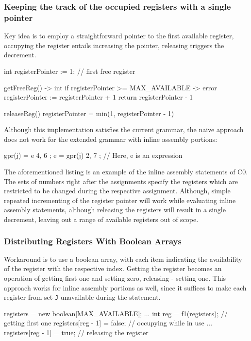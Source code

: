 \subsubsection{Keeping the track of the occupied registers with a single pointer}
Key idea is to employ a straightforward pointer to the first available register, occupying the register entails increasing the pointer,
releasing triggers the decrement.
\begin{codeblock}
int registerPointer := 1; // first free register

getFreeReg() -> int {
    if registerPointer >= MAX_AVAILABLE -> { error }
    registerPointer := registerPointer + 1
    return registerPointer - 1
}

releaseReg() {
    registerPointer = min(1, registerPointer - 1)
}
\end{codeblock}
Although this implementation satisfies the current grammar, the naive approach does not work for the extended grammar
with inline assembly portions:
\begin{codeblock}
gpr(j) = e { 4, 6 };
e = gpr(j) { 2, 7 };
// Here, e is an expression
\end{codeblock}

The aforementioned listing is an example of the inline assembly statements of C0. The sets of numbers right after the assignments
specify the registers which are restricted to be changed during the respective assignment. Although,
simple repeated incrementing of the register pointer will work while evaluating inline assembly statements, although releasing the
registers will result in a single decrement, leaving out a range of available registers out of scope.

\subsubsection{Distributing Registers With Boolean Arrays}
Workaround is to use a boolean array, with each item indicating the availability of the register
with the respective index. Getting the register becomes an operation of getting first one and setting zero,
releasing - setting one. This approach works for inline assembly portions as well, since it suffices to make
each register from set \verb+J+ unavailable during the statement.
\newpage
\begin{codeblock}
registers = new boolean[MAX_AVAILABLE];
...
int reg = f1(registers); // getting first one
registers[reg - 1] = false; // occupying while in use
...
registers[reg - 1] = true; // releasing the register
\end{codeblock}
